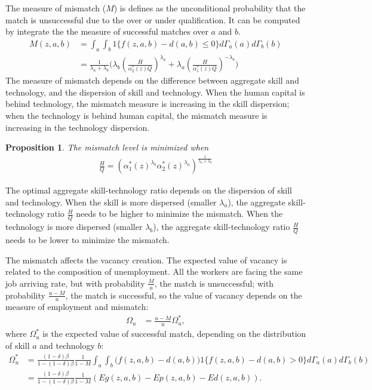 \documentclass[12pt]{article}
\newtheorem{proposition}{Proposition}
\newcommand{\1}{\mathbb{1}}
\begin{document}
The measure of mismatch ($M$) is defines as the unconditional probability that the match is unsuccessful due to the over or under qualification. It can be computed by integrate the the measure of successful matches over $a$ and $b$. 
\begin{align*}
M(z,a,b) &= \int_a\int_b1\{f(z,a,b)-d(a,b) \leq 0\}d\Gamma_a(a)d\Gamma_b(b) \\
&= \frac{1}{\lambda_a+\lambda_b}\Big(\lambda_b(\frac{H}{\alpha_2^*(z)Q})^{\lambda_a}+\lambda_a(\frac{H}{\alpha_1^*(z)Q})^{-\lambda_b}\Big)
\end{align*}
The measure of mismatch depends on the difference between aggregate skill and technology, and the dispersion of skill and technology. When the human capital is behind technology, the mismatch measure is increasing in the skill dispersion; when the technology is behind human capital, the mismatch measure is increasing in the technology dispersion.
\begin{proposition}
The mismatch level is minimized when 
\begin{align*}
\frac{H}{Q} = (\alpha_1^*(z)^{\lambda_b}\alpha_2^*(z)^{\lambda_a})^{\frac{1}{\lambda_a+\lambda_b}}
\end{align*}
\end{proposition}
The optimal aggregate skill-technology ratio depends on the dispersion of skill and technology. When the skill is more dispersed (smaller $\lambda_a$), the aggregate skill-technology ratio $\frac{H}{Q}$ needs to be higher to minimize the mismatch. When the technology is more dispersed (smaller $\lambda_b$), the aggregate skill-technology ratio $\frac{H}{Q}$ needs to be lower to minimize the mismatch. 

The mismatch affects the vacancy creation. The expected value of vacancy is related to the composition of unemployment. All the workers are facing the same job arriving rate, but with probability $\frac{M}{u}$, the match is unsuccessful; with probability $\frac{u-M}{u}$, the match is successful, so the value of vacancy depends on the measure of employment and mismatch: 
\begin{align*}
\Omega_u &= \frac{u-M}{u}\Omega_u^*,
\end{align*}
where $\Omega_u^*$ is the expected value of successful match, depending on the distribution of skill $a$ and technology $b$: 
\begin{align*}
\Omega_u^* &= \frac{(1-\delta)\beta}{1-(1-\delta)\beta}\frac{1}{1-M}\int_a\int_b\Big(f(z,a,b)-d(a,b)\Big)1\{f(z,a,b)-d(a,b)>0\}d\Gamma_a(a)d\Gamma_b(b) \\
				&=\frac{(1-\delta)\beta}{1-(1-\delta)\beta} \frac{1}{1-M}  (Eg(z,a,b)-Ep(z,a,b)-Ed(z,a,b)).
\end{align*}
\end{document}
